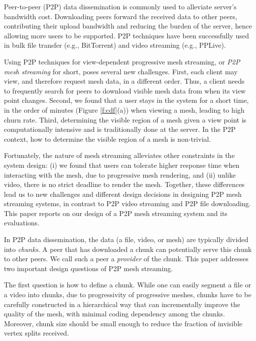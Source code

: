     Peer-to-peer (P2P) data dissemination is commonly used to
    alleviate server's bandwidth cost.  Downloading
    peers forward the received data to other peers,
    contributing their upload bandwidth and reducing the
    burden of the server, hence allowing more users to
    be supported.  P2P techniques have been successfully used 
    in bulk file transfer (e.g., BitTorrent) and video
    streaming (e.g., PPLive).

    Using P2P techniques for view-dependent progressive mesh
    streaming, or \textit{P2P mesh streaming} for short, poses 
    several new challenges.  First, each
    client may view, and therefore request mesh data, in a 
    different order.
    Thus, a client needs
    to frequently search for peers to download visible mesh
    data from when its view point changes.  Second, we
    found that a user stays in the system for a short time,
    in the order of minutes
    (Figure \ref{f:cdf}(a))
    when viewing a mesh, leading to high churn rate.  Third,
    determining the visible region of a mesh given a view
    point is computationally intensive and is
    traditionally done at the server.  In the P2P context,
    how to determine the visible region of a mesh is
    non-trivial.

    Fortunately, the nature of mesh streaming alleviates
    other constraints in the system design:  (i) we found
    that users can tolerate higher response time when
    interacting with the mesh, due to progressive mesh rendering, 
    and (ii) unlike video, there is no strict 
    deadline to render the mesh.
    Together, these differences 
    lead us to new challenges and different design decisions in 
    designing P2P mesh streaming systems, in contrast to P2P
    video streaming and P2P file downloading.  This paper
    reports on our design of a P2P mesh streaming system and
    its evaluations.

    In P2P data dissemination, the data (a file, video, or
    mesh) are typically divided into \textit{chunks}.  A
    peer that has downloaded a chunk can potentially serve
    this chunk to other peers.  We call such a peer a
    \textit{provider} of the chunk.  This paper addresses
    two important design questions of P2P mesh streaming.

    The first question is how to define a chunk.  While one 
    can easily segment a 
    file or a video into chunks, due to progressivity
    of progressive meshes, chunks have to be carefully 
    constructed in a hierarchical way that can
    incrementally improve the quality of the mesh, with
    minimal coding dependency among the chunks.
    Moreover, chunk size should be small enough to 
    reduce the fraction of invisible vertex splits
    received. 

